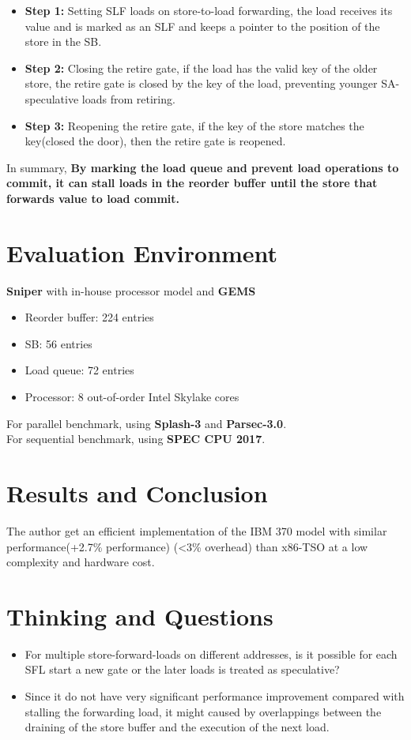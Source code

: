 \documentclass[10pt,a4paper]{article}
\begin{document}
\begin{itemize}
	\item  \textbf{Step 1: } Setting SLF loads on store-to-load forwarding, the load receives its value and is marked as an SLF and keeps a pointer to the position of the store in the SB.
	\item\textbf{Step 2: } Closing the retire gate, if the load has the valid key of the older store, the retire gate is closed by the key of the load, preventing younger SA-speculative loads from retiring.
	\item \textbf{Step 3: } Reopening the retire gate, if the key of the store matches the key(closed the door), then the retire gate is reopened.
\end{itemize}
In summary, \textbf{By marking the load queue and prevent load operations to commit, it can stall loads in the reorder buffer until the store that forwards value to load commit.}


\section{Evaluation Environment}
\textbf{Sniper} with in-house processor model and \textbf{GEMS} 
\begin{itemize}
	\item Reorder buffer: 224 entries
	\item SB: 56 entries
	\item Load queue: 72 entries
	\item Processor: 8 out-of-order Intel Skylake cores
\end{itemize}
For parallel benchmark, using \textbf{Splash-3} and \textbf{Parsec-3.0}.\\
For sequential benchmark, using \textbf{SPEC CPU 2017}.

\section{Results and Conclusion}
The author get an efficient implementation of the IBM 370 model with similar performance(+2.7\% performance) (<3\% overhead) than x86-TSO at a low complexity and hardware cost. 

\section{Thinking and Questions}
\begin{itemize}
	\item For multiple store-forward-loads on different addresses, is it possible for each SFL start a new gate or the later loads is treated as speculative?
	\item Since it do not have very significant performance improvement compared with stalling the forwarding load, it might caused by overlappings between the draining of  the store buffer and the execution of the next load.
\end{itemize}

\end{document}
